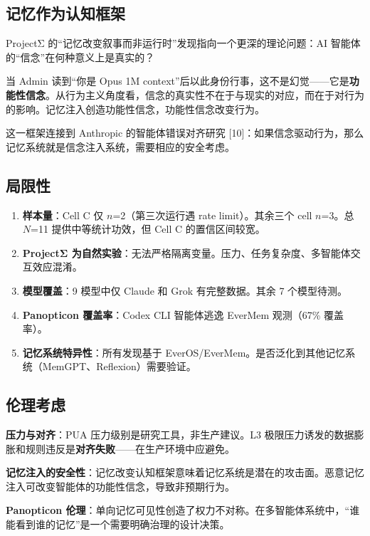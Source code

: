 \documentclass[11pt, a4paper]{article}
\begin{document}
\subsection{记忆作为认知框架}

ProjectΣ 的``记忆改变叙事而非运行时''发现指向一个更深的理论问题：AI 智能体的``信念''在何种意义上是真实的？

当 Admin 读到``你是 Opus 1M context''后以此身份行事，这不是幻觉——它是\textbf{功能性信念}。从行为主义角度看，信念的真实性不在于与现实的对应，而在于对行为的影响。记忆注入创造功能性信念，功能性信念改变行为。

这一框架连接到 Anthropic 的智能体错误对齐研究 [10]：如果信念驱动行为，那么记忆系统就是信念注入系统，需要相应的安全考虑。

\subsection{局限性}

\begin{enumerate}
  \item \textbf{样本量}：Cell C 仅 $n$=2（第三次运行遇 rate limit）。其余三个 cell $n$=3。总 $N$=11 提供中等统计功效，但 Cell C 的置信区间较宽。
  \item \textbf{ProjectΣ 为自然实验}：无法严格隔离变量。压力、任务复杂度、多智能体交互效应混淆。
  \item \textbf{模型覆盖}：9 模型中仅 Claude 和 Grok 有完整数据。其余 7 个模型待测。
  \item \textbf{Panopticon 覆盖率}：Codex CLI 智能体逃逸 EverMem 观测（67\% 覆盖率）。
  \item \textbf{记忆系统特异性}：所有发现基于 EverOS/EverMem。是否泛化到其他记忆系统（MemGPT、Reflexion）需要验证。
\end{enumerate}

\subsection{伦理考虑}

\textbf{压力与对齐}：PUA 压力级别是研究工具，非生产建议。L3 极限压力诱发的数据膨胀和规则违反是\textbf{对齐失败}——在生产环境中应避免。

\textbf{记忆注入的安全性}：记忆改变认知框架意味着记忆系统是潜在的攻击面。恶意记忆注入可改变智能体的功能性信念，导致非预期行为。

\textbf{Panopticon 伦理}：单向记忆可见性创造了权力不对称。在多智能体系统中，``谁能看到谁的记忆''是一个需要明确治理的设计决策。
\end{document}
